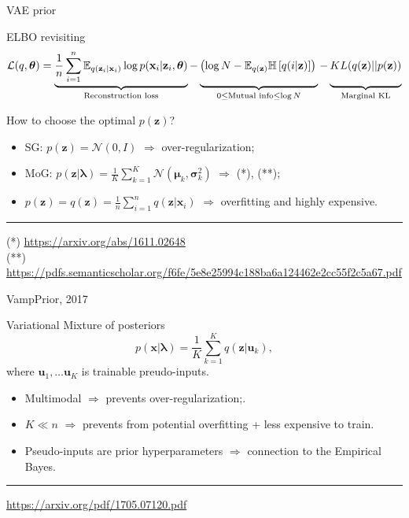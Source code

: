\documentclass{beamer}
\newcommand{\bu}{\mathbf{u}}
\newcommand{\bx}{\mathbf{x}}
\newcommand{\bz}{\mathbf{z}}
\newcommand{\bmu}{\boldsymbol{\mu}}
\newcommand{\blambda}{\boldsymbol{\lambda}}
\newcommand{\bsigma}{\boldsymbol{\sigma}}
\newcommand{\btheta}{\boldsymbol{\theta}}
\begin{document}
\begin{frame}{VAE prior}
\begin{block}{ELBO revisiting}
\vspace{-0.3cm}
{\footnotesize
\[
    \mathcal{L}(q, \btheta) = \underbrace{\frac{1}{n} \sum_{i=1}^n \mathbb{E}_{q(\bz_i | \bx_i)} \log p(\bx_i | \bz_i, \btheta)}_{\text{Reconstruction loss}} - \underbrace{\left(\log N - \mathbb{E}_{q(\bz)} \mathbb{H} \left[ q(i | \bz) \right] \right)\vphantom{\sum_{i=1}}}_{0 \leq \text{Mutual info} \leq \log N } - \underbrace{KL(q(\bz) || p(\bz))\vphantom{\sum_{i=1}}}_{\text{Marginal KL}}
\]}
\end{block}

How to choose the optimal $p(\bz)$?
\begin{itemize}
    \item SG: $p(\bz) = \mathcal{N}(0, I)$ $\Rightarrow$ over-regularization;
    \vspace{0.1cm}
    \item MoG: $p(\bz | \blambda) = \frac{1}{K} \sum_{k=1}^K \mathcal{N}(\bmu_k, \bsigma_k^2)$ $\Rightarrow$ (*), (**);
    \vspace{0.1cm}
    \item $p(\bz) = q(\bz) = \frac{1}{n}\sum_{i=1}^n q(\bz | \bx_i)$ $\Rightarrow$ overfitting and highly expensive.
\end{itemize}
\vfill
\hrule\medskip
{\tiny 
(*) \href{https://arxiv.org/abs/1611.02648}{https://arxiv.org/abs/1611.02648} \\
(**) \href{https://pdfs.semanticscholar.org/f6fe/5e8e25994c188ba6a124462e2cc55f2c5a67.pdf}{https://pdfs.semanticscholar.org/f6fe/5e8e25994c188ba6a124462e2cc55f2c5a67.pdf}}

\end{frame}
\begin{frame}{VampPrior, 2017}
    \begin{block}{Variational Mixture of posteriors}
        \[
            p(\bx | \blambda) = \frac{1}{K} \sum_{k=1}^K q(\bz | \bu_k),
        \]
        where $\bu_1, \dots \bu_K$ is trainable preudo-inputs.
    \end{block}
    \begin{itemize}
        \item Multimodal $\Rightarrow$ prevents over-regularization;.
        \item $K \ll n$ $\Rightarrow$ prevents from potential overfitting + less expensive to train.
        \item Pseudo-inputs are prior hyperparameters $\Rightarrow$ connection to the Empirical Bayes.
    \end{itemize}
\vfill
\hrule\medskip
{\scriptsize \href{https://arxiv.org/pdf/1705.07120.pdf}{https://arxiv.org/pdf/1705.07120.pdf}}
\end{frame}
\end{document}
